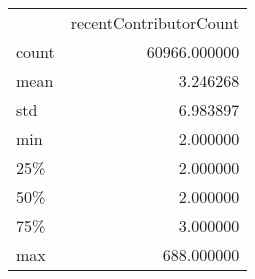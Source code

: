 \begin{tabular}{lr}
 & recentContributorCount \\
count & 60966.000000 \\
mean & 3.246268 \\
std & 6.983897 \\
min & 2.000000 \\
25\% & 2.000000 \\
50\% & 2.000000 \\
75\% & 3.000000 \\
max & 688.000000 \\
\end{tabular}
